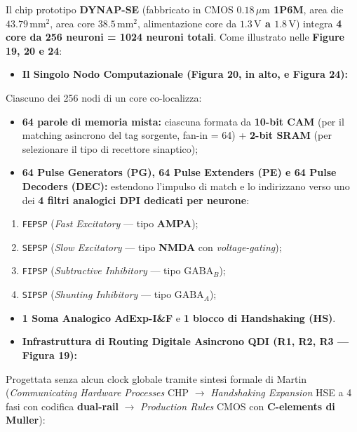 \documentclass[11pt,a4paper]{article}
\begin{document}
Il chip prototipo \textbf{DYNAP-SE} (fabbricato in CMOS \textbf{$0.18\,\mu\text{m}$ 1P6M}, area die \textbf{$43.79\,\text{mm}^2$}, area core \textbf{$38.5\,\text{mm}^2$}, alimentazione core da \textbf{$1.3\,\text{V}$ a $1.8\,\text{V}$}) integra \textbf{4 core da 256 neuroni = 1024 neuroni totali}. Come illustrato nelle \textbf{Figure 19, 20 e 24}:
\begin{itemize}
  \item \textbf{Il Singolo Nodo Computazionale (Figura 20, in alto, e Figura 24):}
\end{itemize}
Ciascuno dei 256 nodi di un core co-localizza:
\begin{itemize}
  \item \textbf{64 parole di memoria mista:} ciascuna formata da \textbf{10-bit CAM} (per il matching asincrono del tag sorgente, fan-in = 64) + \textbf{2-bit SRAM} (per selezionare il tipo di recettore sinaptico);
  \item \textbf{64 Pulse Generators (PG), 64 Pulse Extenders (PE) e 64 Pulse Decoders (DEC):} estendono l'impulso di match e lo indirizzano verso uno dei \textbf{4 filtri analogici DPI dedicati per neurone}:
\end{itemize}
\begin{enumerate}
  \item \texttt{FEPSP} (\textit{Fast Excitatory} --- tipo \textbf{AMPA});
  \item \texttt{SEPSP} (\textit{Slow Excitatory} --- tipo \textbf{NMDA} con \textit{voltage-gating});
  \item \texttt{FIPSP} (\textit{Subtractive Inhibitory} --- tipo \textbf{$\text{GABA}_B$});
  \item \texttt{SIPSP} (\textit{Shunting Inhibitory} --- tipo \textbf{$\text{GABA}_A$});
\end{enumerate}
\begin{itemize}
  \item \textbf{1 Soma Analogico AdExp-I\&F} e \textbf{1 blocco di Handshaking (HS)}.
  \item \textbf{Infrastruttura di Routing Digitale Asincrono QDI (R1, R2, R3 --- Figura 19):}
\end{itemize}
Progettata senza alcun clock globale tramite sintesi formale di Martin (\textit{Communicating Hardware Processes} CHP $\to$ \textit{Handshaking Expansion} HSE a 4 fasi con codifica \textbf{dual-rail} $\to$ \textit{Production Rules} CMOS con \textbf{C-elements di Muller}):
\end{document}
